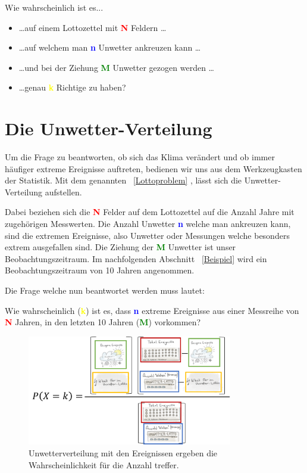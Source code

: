 \begin{refsection}
Wie wahrscheinlich ist es...

\begin{itemize}
\item \dots auf einem Lottozettel mit \textcolor{red}{\textbf{N}} Feldern \dots
\item \dots auf welchem man \textcolor{blue}{\textbf{n}} Unwetter ankreuzen kann \dots
\item \dots und bei der Ziehung \textcolor{green}{\textbf{M}} Unwetter gezogen werden \dots
\item \dots genau \textcolor{yellow}{\textbf{k}} Richtige zu haben?
\end{itemize}


\section{Die Unwetter-Verteilung}
Um die Frage zu beantworten, ob sich das Klima verändert und ob immer häufiger extreme Ereignisse auftreten, bedienen wir uns aus dem Werkzeugkasten der Statistik. Mit dem genannten ~\ref{Lottoproblem} , lässt sich die Unwetter-Verteilung aufstellen.

Dabei beziehen sich die \textcolor{red}{\textbf{N}} Felder auf dem Lottozettel auf die Anzahl Jahre mit zugehörigen Messwerten. Die Anzahl Unwetter \textcolor{blue}{\textbf{n}} welche man ankreuzen kann, sind die extremen Ereignisse, also Unwetter oder Messungen welche besonders extrem ausgefallen sind. Die Ziehung der \textcolor{green}{\textbf{M}} Unwetter ist unser Beobachtungszeitraum. Im nachfolgenden Abschnitt ~\ref{Beispiel}  wird ein Beobachtungszeitraum von 10 Jahren angenommen.


Die Frage welche nun beantwortet werden muss lautet:

Wie wahrscheinlich (\textcolor{yellow}{\textbf{k}}) ist es, dass \textcolor{blue}{\textbf{n}} extreme Ereignisse aus einer Messreihe von \textcolor{red}{\textbf{N}} Jahren, in den letzten 10 Jahren (\textcolor{green}{\textbf{M}}) vorkommen?


\begin{figure}[htbp]
\centering
\includegraphics[width=0.8\textwidth]{extrem/Unwettervert.pdf}
\caption{Unwetterverteilung mit den Ereignissen ergeben die Wahrscheinlichkeit für die Anzahl treffer.}
\label{UnwetterVerteilung}
\end{figure}



\end{refsection}
